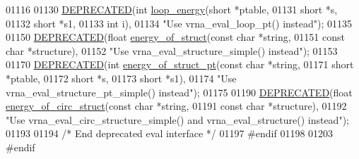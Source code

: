 \begin{DoxyCode}
01116 
01130 \mbox{\hyperlink{eval_8h_aab347a3c03fbe8e7319551b9fa0cce4a}{DEPRECATED}}(\textcolor{keywordtype}{int}   \mbox{\hyperlink{group__eval_ga507d4fd93f4b398d793ba2402731388d}{loop\_energy}}(\textcolor{keywordtype}{short}  *ptable,
01131                              \textcolor{keywordtype}{short}  *s,
01132                              \textcolor{keywordtype}{short}  *s1,
01133                              \textcolor{keywordtype}{int}    i),
01134            \textcolor{stringliteral}{"Use vrna\_eval\_loop\_pt() instead"});
01135 
01150 \mbox{\hyperlink{eval_8h_aab347a3c03fbe8e7319551b9fa0cce4a}{DEPRECATED}}(\textcolor{keywordtype}{float} \mbox{\hyperlink{group__eval_gac2b37fea2145c94d925a3f33378ef87b}{energy\_of\_struct}}(\textcolor{keyword}{const} \textcolor{keywordtype}{char}  *\textcolor{keywordtype}{string},
01151                                   \textcolor{keyword}{const} \textcolor{keywordtype}{char}  *structure),
01152            \textcolor{stringliteral}{"Use vrna\_eval\_structure\_simple() instead"});
01153 
01170 \mbox{\hyperlink{eval_8h_aab347a3c03fbe8e7319551b9fa0cce4a}{DEPRECATED}}(\textcolor{keywordtype}{int} \mbox{\hyperlink{group__eval_ga27ce6f68512d43bf1fe14a06c9d76d5c}{energy\_of\_struct\_pt}}(\textcolor{keyword}{const} \textcolor{keywordtype}{char} *\textcolor{keywordtype}{string},
01171                                    \textcolor{keywordtype}{short}      *ptable,
01172                                    \textcolor{keywordtype}{short}      *s,
01173                                    \textcolor{keywordtype}{short}      *s1),
01174            \textcolor{stringliteral}{"Use vrna\_eval\_structure\_pt\_simple() instead"});
01175 
01190 \mbox{\hyperlink{eval_8h_aab347a3c03fbe8e7319551b9fa0cce4a}{DEPRECATED}}(\textcolor{keywordtype}{float} \mbox{\hyperlink{group__eval_ga657222e2758c46bf13b416ef3032e417}{energy\_of\_circ\_struct}}(\textcolor{keyword}{const} \textcolor{keywordtype}{char} *\textcolor{keywordtype}{string},
01191                                        \textcolor{keyword}{const} \textcolor{keywordtype}{char} *structure),
01192            \textcolor{stringliteral}{"Use vrna\_eval\_circ\_structure\_simple() and vrna\_eval\_structure() instead"});
01193 
01194 \textcolor{comment}{/* End deprecated eval interface */}
01197 \textcolor{preprocessor}{#endif}
01198 
01203 \textcolor{preprocessor}{#endif}
\end{DoxyCode}

